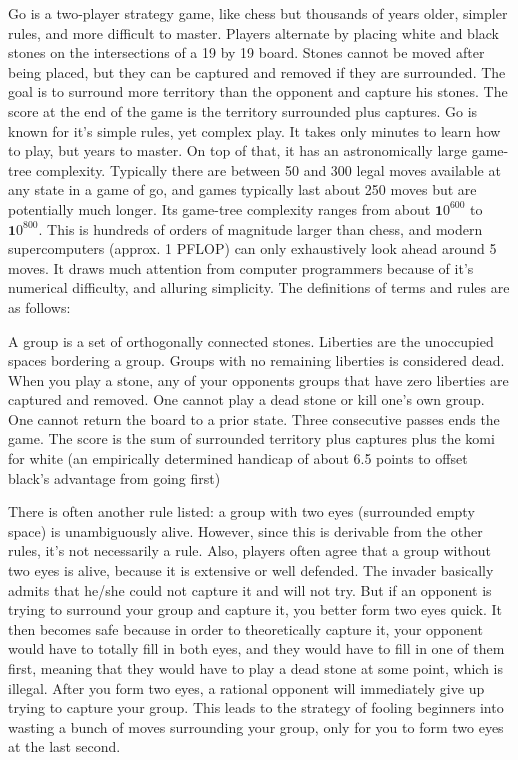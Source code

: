 \documentclass[12pt]{article}
\begin{document}
Go is a two-player strategy game, like chess but thousands of years older, simpler rules, and more difficult to master. Players alternate by placing white and black stones on the intersections of a 19 by 19 board. Stones cannot be moved after being placed, but they can be captured and removed if they are surrounded. The goal is to surround more territory than the opponent and capture his stones. The score at the end of the game is the territory surrounded plus captures. Go is known for it's simple rules, yet complex play. It takes only minutes to learn how to play, but years to master. On top of that, it has an astronomically large game-tree complexity. Typically there are between 50 and 300 legal moves available at any state in a game of go, and games typically last about 250 moves but are potentially much longer. Its game-tree complexity ranges from about $\mathbf 10^{600}$ to $\mathbf 10^{800}$. This is hundreds of orders of magnitude larger than chess, and modern supercomputers (approx. 1 PFLOP) can only exhaustively look ahead around 5 moves. It draws much attention from computer programmers because of it's numerical difficulty, and alluring simplicity. The definitions of terms and rules are as follows:

A group is a set of orthogonally connected stones.
Liberties are the unoccupied spaces bordering a group.
Groups with no remaining liberties is considered dead.
When you play a stone, any of your opponents groups that have zero liberties are captured and removed.
One cannot play a dead stone or kill one's own group.
One cannot return the board to a prior state.
Three consecutive passes ends the game.
The score is the sum of surrounded territory plus captures plus the komi for white (an empirically determined handicap of about 6.5 points to offset black's advantage from going first)

There is often another rule listed: a group with two eyes (surrounded empty space) is unambiguously alive. However, since this is derivable from the other rules, it's not necessarily a rule. Also, players often agree that a group without two eyes is alive, because it is extensive or well defended. The invader basically admits that he/she could not capture it and will not try. But if an opponent is trying to surround your group and capture it, you better form two eyes quick. It then becomes safe because in order to theoretically capture it, your opponent would have to totally fill in both eyes, and they would have to fill in one of them first, meaning that they would have to play a dead stone at some point, which is illegal. After you form two eyes, a rational opponent will immediately give up trying to capture your group. This leads to the strategy of fooling beginners into wasting a bunch of moves surrounding your group, only for you to form two eyes at the last second.
\end{document}
